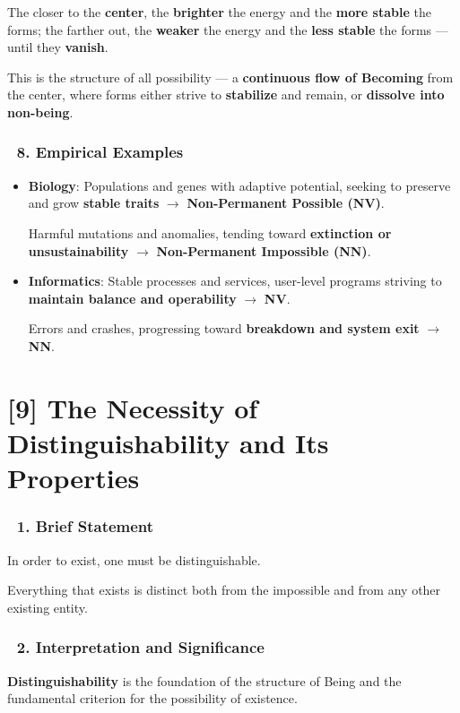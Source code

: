 \documentclass[12pt]{article}
\begin{document}
The closer to the \textbf{center}, the \textbf{brighter} the energy and the \textbf{more stable} the forms; the farther out, the \textbf{weaker} the energy and the \textbf{less stable} the forms — until they \textbf{vanish}.

\bigskip
This is the structure of all possibility — a \textbf{continuous flow of Becoming} from the center, where forms either strive to \textbf{stabilize} and remain, or \textbf{dissolve into non-being}.

\subsubsection*{🔹 8. Empirical Examples}
\begin{itemize}
\item \textbf{Biology}: 
Populations and genes with adaptive potential, seeking to preserve and grow \textbf{stable traits} $\rightarrow$ \textbf{Non-Permanent Possible (NV)}.

Harmful mutations and anomalies, tending toward \textbf{extinction or unsustainability} $\rightarrow$ \textbf{Non-Permanent Impossible (NN)}.

\item \textbf{Informatics}: 
Stable processes and services, user-level programs striving to \textbf{maintain balance and operability} $\rightarrow$ \textbf{NV}.

Errors and crashes, progressing toward \textbf{breakdown and system exit} $\rightarrow$ \textbf{NN}.
\end{itemize}

\section*{[9] The Necessity of Distinguishability and Its Properties}

\subsubsection*{🔹 1. Brief Statement}
In order to exist, one must be distinguishable.

Everything that exists is distinct both from the impossible and from any other existing entity.

\subsubsection*{🔹 2. Interpretation and Significance}
\textbf{Distinguishability} is the foundation of the structure of Being and the fundamental criterion for the possibility of existence.
\end{document}
